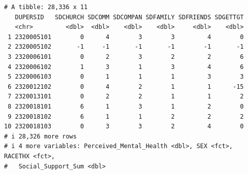 \documentclass[
]{apa7}
\begin{document}
\begin{verbatim}
# A tibble: 28,336 x 11
   DUPERSID   SDCHURCH SDCOMM SDCOMPAN SDFAMILY SDFRIENDS SDGETTGT
   <chr>         <dbl>  <dbl>    <dbl>    <dbl>     <dbl>    <dbl>
 1 2320005101        0      4        3        3         4        0
 2 2320005102       -1     -1       -1       -1        -1       -1
 3 2320006101        0      2        3        2         2        6
 4 2320006102        1      3        1        3         4        6
 5 2320006103        0      1        1        1         3        3
 6 2320012102        0      4        2        1         1      -15
 7 2320013101        0      2        2        1         1        2
 8 2320018101        6      1        3        1         2        0
 9 2320018102        6      1        1        2         2        2
10 2320018103        0      3        3        2         4        0
# i 28,326 more rows
# i 4 more variables: Perceived_Mental_Health <dbl>, SEX <fct>, RACETHX <fct>,
#   Social_Support_Sum <dbl>
\end{verbatim}
\end{document}
